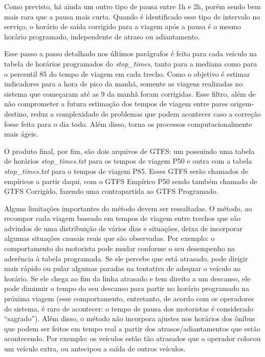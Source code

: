 \documentclass[        
    a4paper,          %
    12pt,             %
    chapter=TITLE,    %
    section=Title,    %
    subsection=Title, %
    oneside,          %
    english,          %
    spanish,          %
    brazil,           %
    fleqn             %
]{abntex2}
\begin{document}
  Como previsto, há ainda um outro tipo de pausa entre 1h e 2h, porém sendo bem mais rara que a pausa mais curta. Quando é identificado esse tipo de intervalo no serviço, o horário de saída corrigido para a viagem após a pausa é o mesmo horário programado, independente de atraso ou adiantamento.
  
  Esse passo a passo detalhado nos últimos parágrafos é feito para cada veículo na tabela de horários programados do \emph{stop\_times}, tanto para a mediana como para o percentil 85 do tempo de viagem em cada trecho. Como o objetivo é estimar indicadores para a hora de pico da manhã, somente as viagens realizadas no sistema que começaram até as 9 da manhã foram corrigidas. Esse filtro, além de não comprometer a futura estimação dos tempos de viagem entre pares origem-destino, reduz a complexidade de problemas que podem acontecer caso a correção fosse feita para o dia todo. Além disso, torna os processos computacionalmente mais ágeis.
  
  O produto final, por fim, são dois arquivos de GTFS: um possuindo uma tabela de horários \emph{stop\_times.txt} para os tempos de viagem P50 e outra com a tabela \emph{stop\_times.txt} para o tempos de viagem P85. Esses GTFS serão chamados de empíricos a partir daqui, com o GTFS Empírico P50 sendo também chamado de GTFS Corrigido, fazendo uma contrapartida ao GTFS Programado.
  
  Alguns limitações importantes do método devem ser ressaltadas. O método, ao recompor cada viagem baseado em tempos de viagem entre trechos que são advindos de uma distribuição de vários dias e situações, deixa de incorporar algumas situações causais reais que são observadas. Por exemplo: o comportamento do motorista pode mudar conforme o seu desempenho na aderência à tabela programada. Se ele percebe que está atrasado, pode dirigir mais rápido ou pular algumas paradas na tentativa de adequar o veículo ao horário. Se ele chega ao fim da linha atrasado e tem direito a um descanso, ele pode diminuir o tempo do seu descanso para partir no horário programado na próxima viagem (esse comportamento, entretanto, de acordo com os operadores do sistema, é raro de acontecer: o tempo de pausa dos motoristas é considerado ``sagrado''). Além disso, o método não incorpora ajustes nos horários dos ônibus que podem ser feitos em tempo real a partir dos atrasos/adiantamentos que estão acontecendo. Por exemplo: os veículos estão tão atrasados que o operador colocou um veículo extra, ou antecipou a saída de outros veículos.
  
\end{document}
